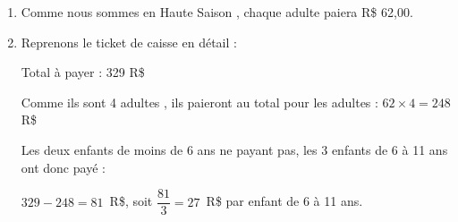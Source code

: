 
\medskip

\begin{enumerate}
\item Comme nous sommes en \og  Haute Saison \fg, chaque adulte paiera R\$ 62,00.


\item Reprenons le ticket de caisse en détail :

Total à payer : 329 R\$

Comme ils sont 4 adultes , ils paieront au total pour les adultes : $62 \times 4 = 248$ R\$

Les deux enfants de moins de 6 ans ne payant pas, les 3 enfants de 6 à 11 ans ont donc payé :

$329 - 248 = 81$~R\$, soit $\dfrac{81}{3} = 27$~R\$ par enfant de 6 à 11 ans.

\end{enumerate}

\vspace{0,25cm}

